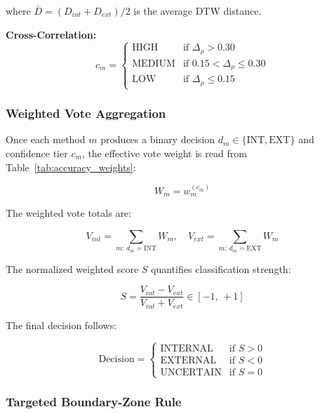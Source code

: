 \documentclass[journal]{IEEEtran}
\begin{document}
\noindent where $\bar{D} = (D_{int}+D_{ext})/2$ is the average DTW
distance.

\textbf{Cross-Correlation:}
\begin{equation}
c_m = \begin{cases}
\text{HIGH}   & \text{if } \Delta_\rho > 0.30 \\
\text{MEDIUM} & \text{if } 0.15 < \Delta_\rho \leq 0.30 \\
\text{LOW}    & \text{if } \Delta_\rho \leq 0.15
\end{cases}
\end{equation}

\subsubsection{Weighted Vote Aggregation}

Once each method $m$ produces a binary decision $d_m \in
\{\text{INT}, \text{EXT}\}$ and confidence tier $c_m$, the effective
vote weight is read from Table~\ref{tab:accuracy_weights}:

\begin{equation}
W_m = w_m^{(c_m)}
\end{equation}

The weighted vote totals are:

\begin{equation}
V_{int} = \sum_{m:\,d_m = \text{INT}} W_m, \quad
V_{ext} = \sum_{m:\,d_m = \text{EXT}} W_m
\end{equation}

The normalized weighted score $S$ quantifies classification strength:

\begin{equation}
S = \frac{V_{int} - V_{ext}}{V_{int} + V_{ext}} \in [-1,\,+1]
\end{equation}

The final decision follows:

\begin{equation}
\text{Decision} = \begin{cases}
\text{INTERNAL} & \text{if } S > 0 \\
\text{EXTERNAL} & \text{if } S < 0 \\
\text{UNCERTAIN}& \text{if } S = 0
\end{cases}
\end{equation}

\subsubsection{Targeted Boundary-Zone Rule}
\end{document}
